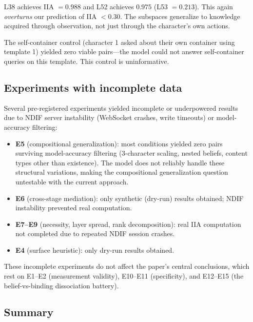\documentclass[11pt]{article}
\begin{document}
L38 achieves IIA $= 0.988$ and L52 achieves $0.975$ (L53 $= 0.213$). This again \emph{overturns} our prediction of IIA $< 0.30$. The subspaces generalize to knowledge acquired through observation, not just through the character's own actions.

The self-container control (character 1 asked about their own container using template 1) yielded zero viable pairs---the model could not answer self-container queries on this template. This control is uninformative.

\subsection{Experiments with incomplete data}

Several pre-registered experiments yielded incomplete or underpowered results due to NDIF server instability (WebSocket crashes, write timeouts) or model-accuracy filtering:

\begin{itemize}
\item \textbf{E5} (compositional generalization): most conditions yielded zero pairs surviving model-accuracy filtering (3-character scaling, nested beliefs, content types other than existence). The model does not reliably handle these structural variations, making the compositional generalization question untestable with the current approach.
\item \textbf{E6} (cross-stage mediation): only synthetic (dry-run) results obtained; NDIF instability prevented real computation.
\item \textbf{E7--E9} (necessity, layer spread, rank decomposition): real IIA computation not completed due to repeated NDIF session crashes.
\item \textbf{E4} (surface heuristic): only dry-run results obtained.
\end{itemize}

These incomplete experiments do not affect the paper's central conclusions, which rest on E1--E2 (measurement validity), E10--E11 (specificity), and E12--E15 (the belief-vs-binding dissociation battery).

\subsection{Summary}
\end{document}

